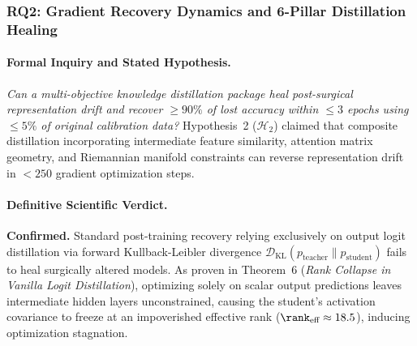 \subsubsection{RQ2: Gradient Recovery Dynamics and 6-Pillar Distillation Healing}
\label{subsubsec:res_rq2}

\paragraph{Formal Inquiry and Stated Hypothesis.}
\emph{Can a multi-objective knowledge distillation package heal post-surgical representation drift and recover $\ge 90\%$ of lost accuracy within $\le 3$ epochs using $\le 5\%$ of original calibration data?}
Hypothesis~2 ($\mathcal{H}_2$) claimed that composite distillation incorporating intermediate feature similarity, attention matrix geometry, and Riemannian manifold constraints can reverse representation drift in $<250$ gradient optimization steps.

\paragraph{Definitive Scientific Verdict.}
\textbf{Confirmed.}
Standard post-training recovery relying exclusively on output logit distillation via forward Kullback-Leibler divergence $\mathcal{D}_{\text{KL}}(p_{\text{teacher}} \parallel p_{\text{student}})$ fails to heal surgically altered models.
As proven in Theorem~6 (\emph{Rank Collapse in Vanilla Logit Distillation}), optimizing solely on scalar output predictions leaves intermediate hidden layers unconstrained, causing the student's activation covariance to freeze at an impoverished effective rank ($\rank_{\text{eff}} \approx 18.5$), inducing optimization stagnation.

